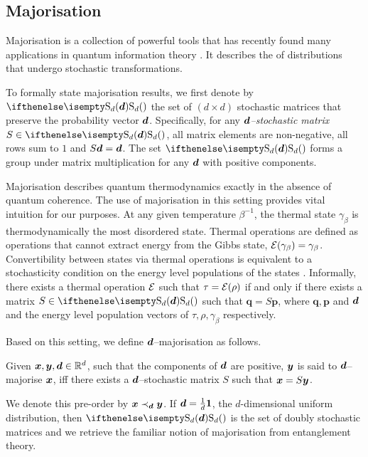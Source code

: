 \documentclass[pra,
aps,
twocolumn,
superscriptaddress,
groupedaddress,
nofootinbib,
reprint
]{revtex4-1}
\begin{document}
\subsection{Majorisation}
\label{sec:major}

Majorisation is a collection of powerful tools that has recently found many applications in quantum information theory .
It describes the  of distributions that undergo stochastic transformations.

To formally state majorisation results, we first denote by $\stoch$ the set of $(d \times d)$ stochastic matrices that preserve the probability vector $\bm{d}$.
Specifically, for any \emph{$\bm{d}$--stochastic matrix} $S \in \stoch$, all matrix elements are non-negative, all rows sum to $1$ and $S\bm{d} = \bm{d}$.
The set $\stoch$ forms a group under matrix multiplication for any $\bm{d}$ with positive components.

Majorisation describes quantum thermodynamics exactly in the absence of quantum coherence.
The use of majorisation in this setting provides vital intuition for our purposes.
At any given temperature $\beta^{-1}$, the thermal state $\gamma_\beta$ is thermodynamically the most disordered state. 
Thermal operations are defined as operations that cannot extract energy from the Gibbs state, $\mathcal{E}(\gamma_\beta) = \gamma_\beta$.
Convertibility between states via thermal operations is equivalent to a stochasticity condition on the energy level populations of the states .
Informally, there exists a thermal operation $\mathcal{E}$ such that $\tau = \mathcal{E}(\rho)$ if and only if there exists a matrix $S \in \stoch$ such that $\bm{q} = S\bm{p}$, where $\bm{q}, \bm{p}$ and $\bm{d}$ and the energy level population vectors of $\tau, \rho, \gamma_\beta$ respectively.

Based on this setting, we define $\bm{d}$--majorisation as follows.
\begin{definition}\label{def:dmajor}
    Given $\bm{x}, \bm{y}, \bm{d} \in \mathbb{R}^d$, such that the components of $\bm{d}$ are positive, $\bm{y}$ is said to $\bm{d}$--majorise $\bm{x}$, iff there exists a $\bm{d}$--stochastic matrix $S$ such that $\bm{x} = S\bm{y}$.
\end{definition}
We denote this pre-order by $\bm{x} \prec_{\bm{d}} \bm{y}$.
If $\bm{d} = \frac{1}{d}\bm{1}$, the $d$-dimensional uniform distribution, then $\stoch$ is the set of doubly stochastic matrices and we retrieve the familiar notion of majorisation from entanglement theory. 
\end{document}
